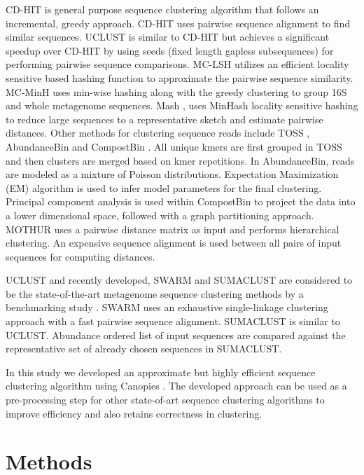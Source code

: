 \documentclass[10pt, conference, compsocconf]{IEEEtran}
\begin{document}
CD-HIT \cite{MARCDhit} is general purpose sequence clustering algorithm that follows an incremental, greedy approach. CD-HIT uses pairwise sequence alignment to find similar sequences. UCLUST \cite{MARuclust} is similar to CD-HIT but achieves a significant speedup over CD-HIT by using seeds (fixed length gapless subsequences) for performing pairwise sequence comparisons. MC-LSH \cite{MARMetaLSH} utilizes an efficient locality sensitive based hashing function to approximate the pairwise sequence similarity. MC-MinH \cite{MARMcMinH} uses min-wise \cite{MARMinWise} hashing along with the greedy clustering to group 16S and whole metagenome sequences. Mash \cite{MAROtherMinH}, uses MinHash locality sensitive hashing to reduce large sequences to a representative sketch and estimate pairwise distances. Other methods for clustering sequence reads include TOSS \cite{MARToss}, AbundanceBin \cite{MARAbundant} and CompostBin \cite{MARCompost}. All unique kmers are first grouped in TOSS and then clusters are merged based on kmer repetitions. In AbundanceBin, reads are modeled as a mixture of Poisson distributions. Expectation Maximization (EM) algorithm is used to infer model parameters for the final clustering. Principal component analysis is used within CompostBin to project the data into a lower dimensional space, followed with a graph partitioning approach. MOTHUR \cite{MARMothur} uses a pairwise distance matrix as input and performs hierarchical clustering. An expensive sequence alignment is used between all pairs of input sequences for computing distances.

UCLUST \cite{MARuclust} and recently developed, SWARM \cite{MARSwarm2} and SUMACLUST \cite{MARSumaclust}  are considered to be the state-of-the-art metagenome sequence clustering methods by a benchmarking study \cite{MARopenDeNovo}. SWARM uses an  exhaustive single-linkage clustering approach with a fast pairwise sequence alignment. SUMACLUST is similar to UCLUST. Abundance ordered list of input sequences are compared against the representative set of already chosen sequences in SUMACLUST. 

In this study we developed an approximate but highly efficient sequence clustering algorithm  using Canopies \cite{MARCanopy}. The developed approach can be used as a pre-processing step for other state-of-art sequence clustering algorithms to improve efficiency and also retains correctness in clustering.

\section{Methods}
\label{sec:Methods}
\end{document}
